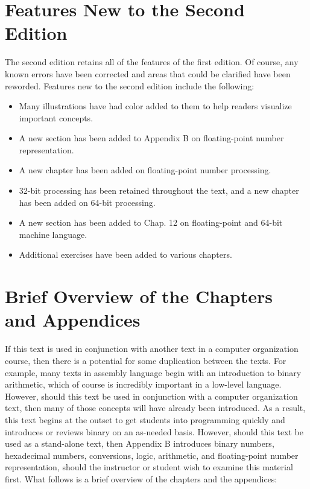 \documentclass[10pt]{book}
\begin{document}
\section*{Features New to the Second Edition}
The second edition retains all of the features of the first edition. Of course, any known errors have been corrected and areas that could be clarified have been reworded. Features new to the second edition include the following:

\begin{itemize}
  \item Many illustrations have had color added to them to help readers visualize important concepts.
  \item A new section has been added to Appendix B on floating-point number representation.
  \item A new chapter has been added on floating-point number processing.
  \item 32-bit processing has been retained throughout the text, and a new chapter has been added on 64-bit processing.
  \item A new section has been added to Chap. 12 on floating-point and 64-bit machine language.
  \item Additional exercises have been added to various chapters.
\end{itemize}

\section*{Brief Overview of the Chapters and Appendices}
If this text is used in conjunction with another text in a computer organization course, then there is a potential for some duplication between the texts. For example, many texts in assembly language begin with an introduction to binary arithmetic, which of course is incredibly important in a low-level language. However, should this text be used in conjunction with a computer organization text, then many of those concepts will have already been introduced. As a result, this text begins at the outset to get students into programming quickly and introduces or reviews binary on an as-needed basis. However, should this text be used as a stand-alone text, then Appendix B introduces binary numbers, hexadecimal numbers, conversions, logic, arithmetic, and floating-point number representation, should the instructor or student wish to examine this material first. What follows is a brief overview of the chapters and the appendices:
\end{document}
